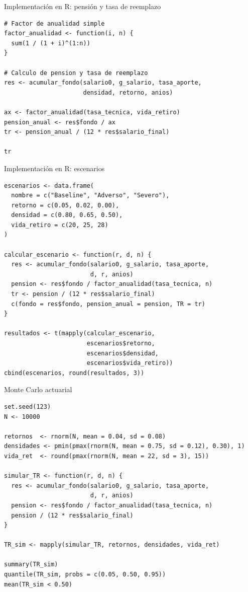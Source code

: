 \documentclass[aspectratio=169,11pt]{beamer}
\begin{document}
\begin{frame}[fragile]{Implementación en R: pensión y tasa de reemplazo}
\begin{lstlisting}[style=Rstyle]
# Factor de anualidad simple
factor_anualidad <- function(i, n) {
  sum(1 / (1 + i)^(1:n))
}

# Calculo de pension y tasa de reemplazo
res <- acumular_fondo(salario0, g_salario, tasa_aporte,
                      densidad, retorno, anios)

ax <- factor_anualidad(tasa_tecnica, vida_retiro)
pension_anual <- res$fondo / ax
tr <- pension_anual / (12 * res$salario_final)

tr
\end{lstlisting}
\end{frame}

\begin{frame}[fragile]{Implementación en R: escenarios}
\begin{lstlisting}[style=Rstyle]
escenarios <- data.frame(
  nombre = c("Baseline", "Adverso", "Severo"),
  retorno = c(0.05, 0.02, 0.00),
  densidad = c(0.80, 0.65, 0.50),
  vida_retiro = c(20, 25, 28)
)

calcular_escenario <- function(r, d, n) {
  res <- acumular_fondo(salario0, g_salario, tasa_aporte,
                        d, r, anios)
  pension <- res$fondo / factor_anualidad(tasa_tecnica, n)
  tr <- pension / (12 * res$salario_final)
  c(fondo = res$fondo, pension_anual = pension, TR = tr)
}

resultados <- t(mapply(calcular_escenario,
                       escenarios$retorno,
                       escenarios$densidad,
                       escenarios$vida_retiro))
cbind(escenarios, round(resultados, 3))
\end{lstlisting}
\end{frame}

\begin{frame}[fragile]{Monte Carlo actuarial}
\begin{lstlisting}[style=Rstyle]
set.seed(123)
N <- 10000

retornos  <- rnorm(N, mean = 0.04, sd = 0.08)
densidades <- pmin(pmax(rnorm(N, mean = 0.75, sd = 0.12), 0.30), 1)
vida_ret  <- round(pmax(rnorm(N, mean = 22, sd = 3), 15))

simular_TR <- function(r, d, n) {
  res <- acumular_fondo(salario0, g_salario, tasa_aporte,
                        d, r, anios)
  pension <- res$fondo / factor_anualidad(tasa_tecnica, n)
  pension / (12 * res$salario_final)
}

TR_sim <- mapply(simular_TR, retornos, densidades, vida_ret)

summary(TR_sim)
quantile(TR_sim, probs = c(0.05, 0.50, 0.95))
mean(TR_sim < 0.50)
\end{lstlisting}
\end{frame}
\end{document}
